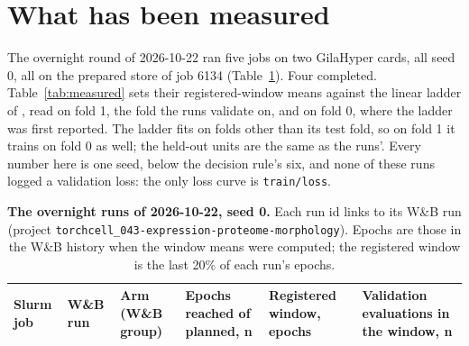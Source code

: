 
\section{What has been measured}
\label{sec:measured}

The overnight round of 2026-10-22 ran five jobs on two GilaHyper cards, all seed 0, all on
the prepared store of job 6134 (Table~\ref{tab:runs}). Four completed. Table~\ref{tab:measured}
sets their registered-window means against the linear ladder of
, read on fold 1, the fold the runs validate on, and on
fold 0, where the ladder was first reported. The ladder fits on folds other than its test
fold, so on fold 1 it trains on fold 0 as well; the held-out units are the same as the
runs'. Every number here is one seed, below the decision rule's six, and none of these runs
logged a validation loss: the only loss curve is \texttt{train/loss}.

\begin{table}[htbp]
\centering
\footnotesize
\setlength{\tabcolsep}{3pt}
\caption[]{\textbf{The overnight runs of 2026-10-22, seed 0.} Each run id links to
its W\&B run (project \texttt{torchcell\_043-expression-proteome-morphology}). Epochs are
those in the W\&B history when the window means were computed; the registered window is the
last 20\% of each run's epochs.}
\label{tab:runs}
\begin{tabular}{>{\raggedright\arraybackslash}p{12mm}>{\raggedright\arraybackslash}p{16mm}>{\raggedright\arraybackslash}p{56mm}>{\raggedleft\arraybackslash}p{26mm}>{\raggedleft\arraybackslash}p{24mm}>{\raggedleft\arraybackslash}p{26mm}}
\toprule
Slurm job & W\&B run & Arm (W\&B group) & Epochs reached of planned, n & Registered window, epochs & Validation evaluations in the window, n \\
\midrule

\end{tabular}
\end{table}

